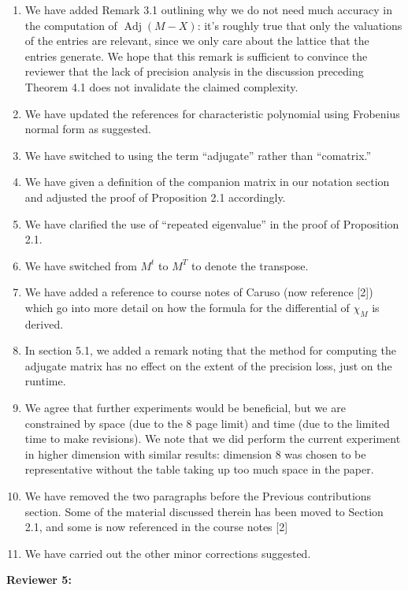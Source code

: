 \documentclass{article}
\DeclareMathOperator{\adj}{Adj}
\newcommand{\done}[1]{#1}
\begin{document}
\begin{enumerate}
\item \done{We have added Remark 3.1 outlining why we do not need much accuracy in the computation of $\adj(M{-}X)$: it's roughly true that only the valuations of the entries are relevant, since we only care about the lattice that the entries generate.  We hope that this remark is sufficient to convince the reviewer that the lack of precision analysis in the discussion preceding Theorem 4.1 does not invalidate the claimed complexity.}
\item \done{We have updated the references for characteristic polynomial using Frobenius normal form as suggested.}
\item \done{We have switched to using the term ``adjugate'' rather than ``comatrix.''}
\item \done{We have given a definition of the companion matrix in our notation section and adjusted the proof of Proposition 2.1 accordingly.}
\item \done{We have clarified the use of ``repeated eigenvalue'' in the proof of Proposition 2.1.}
\item \done{We have switched from $M^t$ to $M^T$ to denote the transpose.}
\item \done{We have added a reference to course notes of Caruso (now reference [2]) which go into more detail on how the formula for the differential of $\chi_M$ is derived.}
\item \done{In section 5.1, we added a remark noting that the method for computing the adjugate matrix has no effect on the extent of the precision loss, just on the runtime.}
\item \done{We agree that further experiments would be beneficial, but we are constrained by space (due to the 8 page limit) and time (due to the limited time to make revisions).  We note that we did perform the current experiment in higher dimension with similar results: dimension $8$ was chosen to be representative without the table taking up too much space in the paper.}
\item \done{We have removed the two paragraphs before the Previous contributions section.  Some of the material discussed therein has been moved to Section 2.1, and some is now referenced in the course notes [2]}
\item \done{We have carried out the other minor corrections suggested.}
\end{enumerate}
\textbf{Reviewer 5:}
\end{document}
